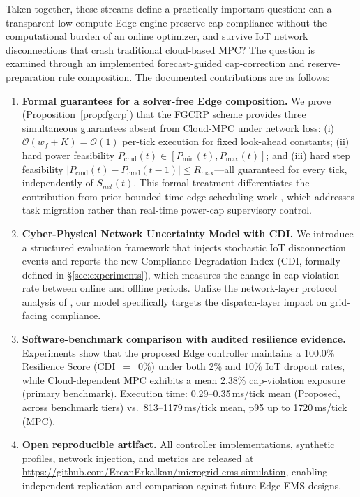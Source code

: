 \documentclass[preprint,12pt]{elsarticle}
\newcommand{\Rmax}{R_{\max}}
\newcommand{\Pcmd}{P_{\mathrm{cmd}}}
\begin{document}
Taken together, these streams define a practically important question: can a transparent low-compute Edge engine preserve cap compliance without the computational burden of an online optimizer, and survive IoT network disconnections that crash traditional cloud-based MPC? The question is examined through an implemented forecast-guided cap-correction and reserve-preparation rule composition. The documented contributions are as follows:
\begin{enumerate}
\item \textbf{Formal guarantees for a solver-free Edge composition.} We prove (Proposition~\ref{prop:fgcrp}) that the FGCRP scheme provides three simultaneous guarantees absent from Cloud-MPC under network loss: (i) $\mathcal{O}(w_f{+}K)=\mathcal{O}(1)$ per-tick execution for fixed look-ahead constants; (ii) hard power feasibility $\Pcmd(t)\in[P_{\min}(t),P_{\max}(t)]$; and (iii) hard step feasibility $|\Pcmd(t)-\Pcmd(t-1)|\le\Rmax$---all guaranteed for every tick, independently of $S_{net}(t)$. This formal treatment differentiates the contribution from prior bounded-time edge scheduling work \cite{liu2025fgcs}, which addresses task migration rather than real-time power-cap supervisory control.
\item \textbf{Cyber-Physical Network Uncertainty Model with CDI.} We introduce a structured evaluation framework that injects stochastic IoT disconnection events and reports the new Compliance Degradation Index (CDI, formally defined in \S\ref{sec:experiments}), which measures the change in cap-violation rate between online and offline periods. Unlike the network-layer protocol analysis of \cite{chen2023fgcs}, our model specifically targets the dispatch-layer impact on grid-facing compliance.
\item \textbf{Software-benchmark comparison with audited resilience evidence.} Experiments show that the proposed Edge controller maintains a 100.0\% Resilience Score (CDI~$=$~0\%) under both 2\% and 10\% IoT dropout rates, while Cloud-dependent MPC exhibits a mean 2.38\% cap-violation exposure (primary benchmark). Execution time: 0.29--0.35\,ms/tick mean (Proposed, across benchmark tiers) vs.\ 813--1179\,ms/tick mean, p95 up to 1720\,ms/tick (MPC).
\item \textbf{Open reproducible artifact.} All controller implementations, synthetic profiles, network injection, and metrics are released at \url{https://github.com/ErcanErkalkan/microgrid-ems-simulation}, enabling independent replication and comparison against future Edge EMS designs.
\end{enumerate}
\end{document}

